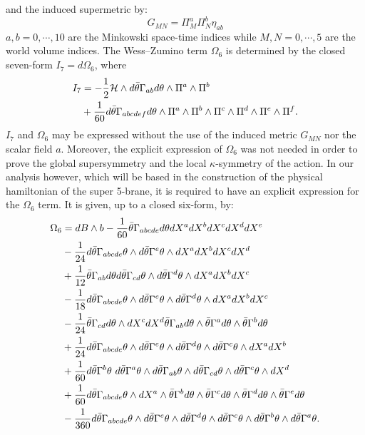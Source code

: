 \documentclass[a4paper,12pt]{article}
\def\btheta{\bar{\theta}}
\begin{document}
and the induced supermetric by:
\begin{equation*}
G_{MN}=\Pi^ a_M\Pi^ b_N\eta_{ab}
\end{equation*}
$a,b=0,\cdots,10$ are the Minkowski  space-time indices while
$M,N=0,\cdots,5$ are the world volume indices. The Wess--Zumino
term $\Omega_6 $ is determined by the closed seven-form $I_7 = d
\Omega_6$, where
\begin{equation*}
\begin{split}
I_7&= - {1\over 2} {\cal H}\wedge d \bar\theta\Gamma_{ab}
d\theta\wedge\Pi^a\wedge\Pi^b\\ &+ {1\over 60} d \bar\theta
\Gamma_{abcdef}d\theta\wedge\Pi^a\wedge\Pi^b\wedge\Pi^c\wedge\Pi^d\wedge\Pi^e\wedge\Pi^f\nonumber.
\label{I7cov}
\end{split}
\end{equation*}
$I_7$ and  $\Omega_6$ may be expressed without the use of the
induced metric $G_{MN}$ nor the scalar field $a$. Moreover, the
explicit expression of $\Omega_6$ was not needed in order to prove
the global supersymmetry and the local $\kappa$-symmetry of the
action. In our analysis however, which will be based in the
construction of the physical hamiltonian of the super 5-brane, it
is required to have an explicit expression for the $\Omega_6$
term. It is given, up to a closed six-form, by:
\begin{equation*}
\begin{split}
\Omega_6&=dB\wedge b-{1\over 60}\btheta\Gamma_{abcde}d\theta
dX^adX^bdX^cdX^ddX^e\\&-{1\over
24}d\btheta\Gamma_{abcde}\theta\wedge d\btheta\Gamma^e\theta\wedge
dX^adX^bdX^cdX^d\\ &+ {1\over 12} \btheta\Gamma_{ab}d\theta
d\btheta\Gamma_{cd}\theta\wedge d\btheta\Gamma^d\theta\wedge
dX^adX^bdX^c
\\&-{1\over 18} d\btheta\Gamma_{abcde}\theta\wedge
d\btheta\Gamma^e\theta\wedge d\btheta\Gamma^d\theta\wedge
dX^adX^bdX^c\\ &- {1\over 24}\btheta\Gamma_{cd}d\theta\wedge
dX^cdX^d \btheta\Gamma_{ab}d\theta\wedge
\btheta\Gamma^ad\theta\wedge \btheta\Gamma^bd\theta \\&+{1\over
24}d\btheta\Gamma_{abcde}\theta\wedge d\btheta\Gamma^e\theta\wedge
d\btheta\Gamma^d\theta\wedge d\btheta\Gamma^c\theta\wedge
dX^adX^b\\ &+{1\over 60}d\btheta\Gamma^b\theta\
d\btheta\Gamma^a\theta \wedge d\btheta\Gamma_{ab}\theta \wedge
d\btheta\Gamma_{cd}\theta \wedge d\btheta\Gamma^c\theta \wedge
dX^d\\&+{1\over 60}d\btheta\Gamma_{abcde}\theta\wedge dX^a\wedge
\btheta\Gamma^bd\theta\wedge \btheta\Gamma^cd\theta \wedge
\btheta\Gamma^dd\theta\wedge \btheta\Gamma^ed\theta\\&-{1\over
360}d\btheta\Gamma_{abcde}\theta\wedge
d\btheta\Gamma^{e}\theta\wedge d\btheta\Gamma^{d}\theta\wedge
d\btheta\Gamma^{c}\theta\wedge d\btheta\Gamma^{b}\theta\wedge
d\btheta\Gamma^{a}\theta.
\end{split}
\end{equation*}
\end{document}
